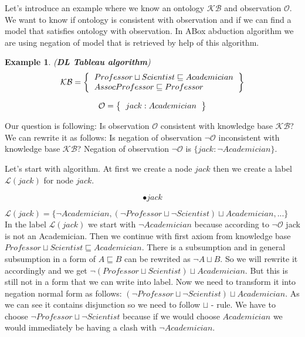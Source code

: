 \documentclass[12pt,a4paper]{article}
\newtheorem{example}{Example}[subsection]
\begin{document}
Let's introduce an example where we know an ontology $\mathcal{KB}$ and observation $\mathcal{O}$. We want to know if ontology is consistent with observation and if we can find a model that satisfies ontology with observation. In ABox abduction algorithm we are using negation of model that is retrieved by help of this algorithm.

\begin{example}{(\textbf{DL Tableau algorithm})}
	\[ 
	\mathcal{KB} = \left\{
	\begin{tabular}{l c}
	$Professor \sqcup Scientist \sqsubseteq Academician$ \\
	$AssocProfessor \sqsubseteq Professor$ \\
	\end{tabular}
	\right \}
	\]
	
	\[ 
	\mathcal{O} = \left\{
	\begin{tabular}{l c}
	$jack : Academician$
	\end{tabular}
	\right \}
	\]	
\end{example}

Our question is following: Is observation $\mathcal{O}$ consistent with knowledge base $\mathcal{KB}$? We can rewrite it as follows: Is negation of observation $\neg \mathcal{O}$ inconsistent with knowledge base $\mathcal{KB}$? Negation of observation $\neg \mathcal{O}$ is $\{ jack : \neg Academician \}$.

Let's start with algorithm. At first we create a node $jack$ then we create a label $\mathcal{L}(jack)$ for node $jack$.

\[ \bullet jack \]

$ \mathcal{L}(jack) = \{ \neg Academician, (\neg Professor \sqcup \neg Scientist) \sqcup Academician, ... \} $ \\


In the label $\mathcal{L}(jack)$ we start with $\neg Academician$ because according to $\neg \mathcal{O}$ jack is not an Academician. Then we continue with first axiom from knowledge base $Professor \sqcup Scientist \sqsubseteq Academician$. There is a subsumption and in general subsumption in a form of $A \sqsubseteq B$ can be rewrited as $\neg A \sqcup B$. So we will rewrite it accordingly and we get $\neg (Professor \sqcup Scientist) \sqcup Academician$. But this is still not in a form that we can write into label. Now we need to transform it into negation normal form as follows: $(\neg Professor \sqcup \neg Scientist) \sqcup Academician$. As we can see it contains disjunction so we need to follow $\sqcup$ - rule. We have to choose $\neg Professor \sqcup \neg Scientist$ because if we would choose $Academician$ we would immediately be having a clash with $\neg Academician$. \\
\end{document}
